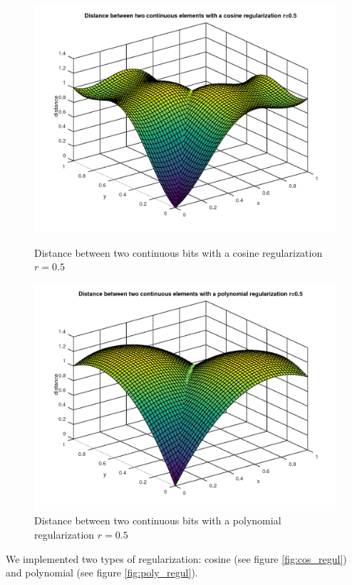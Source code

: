 \begin{figure}
	\centering
	
	\includegraphics[totalheight=0.4\textheight]{img/distance_regul_cos.png}
	\caption{Distance between two continuous bits with a cosine regularization $r=0.5$}
	\label{fig:distance_regul_cos}
	
	\includegraphics[totalheight=0.4\textheight]{img/distance_regul_poly.png}
	\caption{Distance between two continuous bits with a polynomial regularization $r=0.5$}
	\label{fig:distance_regul_poly}
\end{figure}

We implemented two types of regularization: cosine (see figure \ref{fig:cos_regul}) and polynomial (see figure \ref{fig:poly_regul}). 

